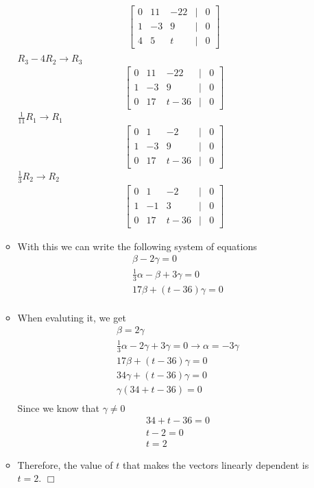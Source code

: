 \documentclass[11pt]{article}
\begin{document}
\begin{enumerate}
\begin{itemize}
    \begin{align*}
    \begin{bmatrix} 0 & 11 & -22 & | & 0 \\ 1 & -3 & 9 & | & 0 \\ 4 & 5 & t & | & 0 \end{bmatrix} \\
    \end{align*}
    $R_3 - 4R_2 \rightarrow R_3$
    \begin{align*}
      \begin{bmatrix}
        0 & 11 & -22 & | & 0 \\ 1 & -3 & 9 & | & 0 \\ 0 & 17 & t - 36 & | & 0
      \end{bmatrix}
    \end{align*}
    $\frac{1}{11}R_1 \rightarrow R_1$
      \begin{align*}
        \begin{bmatrix}
          0 & 1 & -2 & | & 0 \\ 1 & -3 & 9 & | & 0 \\ 0 & 17 & t - 36 & | & 0
        \end{bmatrix}
      \end{align*}
      $\frac{1}{3} R_2 \rightarrow R_2$
        \begin{align*}
          \begin{bmatrix}
            0 & 1 & -2 & | & 0 \\ 1 & -1 & 3 & | & 0 \\ 0 & 17 & t - 36 & | & 0
          \end{bmatrix}
        \end{align*}
    \item[] With this we can write the following system of equations \begin{align*}
      & \beta - 2\gamma = 0 \\
      & \frac{1}{3}\alpha - \beta + 3\gamma = 0 \\
      & 17\beta + (t - 36)\gamma = 0 \\
      \end{align*}
    \item[] When evaluting it, we get \begin{align*}
        & \beta = 2\gamma \\
        & \frac{1}{3}\alpha - 2\gamma + 3\gamma = 0 \rightarrow 
        \alpha = -3\gamma \\
        & 17\beta + (t - 36)\gamma = 0\\
        & 34\gamma + (t - 36)\gamma = 0 \\
        & \gamma(34 + t - 36) = 0 \\
      \end{align*}
      Since we know that $\gamma \neq 0$
      \begin{align*}
        & 34 + t - 36 = 0 \\
        & t - 2 = 0 \\
        & t = 2
      \end{align*}
    \item[] Therefore, the value of $t$ that makes the vectors linearly dependent is $t = 2$. $\Box$


\end{itemize}
\end{enumerate}
\end{document}
